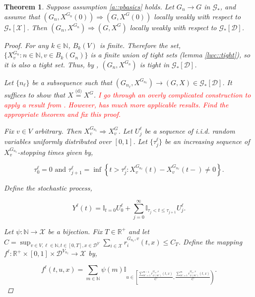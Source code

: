 \documentclass[12pt]{article}
\newcommand{\mb}{\mathbb}
\newcommand{\mc}{\mathcal}
\newcommand{\ra}{\rightarrow}
\newcommand{\te}{\text}
\newcommand{\tr}{\textcolor{red}}
\newcommand{\ind}{\hspace{24pt}}
\newcommand{\deq}{\overset{\text{(d)}}{=}}			%
\newcommand{\cad}{\mc{D}}							%
\newcommand{\sta}{\mc{X}}							%
\newcommand{\Xf}{X}									%
\newcommand{\rate}{r}								%
\newcommand{\xf}{x}									%
\newcommand{\vind}[1]{_{#1}}						%
\newcommand{\tme}[1]{(#1)}							%
\newcommand{\gind}[1]{^{#1}}						%
\newcommand{\stpara}[1]{_{#1}}						%
\newcommand{\gvpara}[2]{^{#1,#2}}					%
\newcommand{\jumpbd}[1]{C_{#1}}						%
\newcommand{\tmepro}[2]{(#1,#2)}					%
\newcommand{\Gs}{\mc{G}_\ast}						%
\newcommand{\trnc}[1]{B_{#1}}						%
\renewcommand{\sp}[1]{[#1]}							%
\newcommand{\Xg}{Y}									%
\newcommand{\rt}{\tau}								%
\renewcommand{\it}[1]{_{#1}}						%
\newtheorem{thms}{Theorem}[section]
\begin{document}
\begin{thms}
Suppose assumption \ref{a::pbasics} holds. Let \(G\it{n} \ra G\) in \(\Gs\), and assume that \((G\it{n},\Xf\gind{G\it{n}}\tme{0}) \Rightarrow (G,\Xf\gind{G}\tme{0})\) locally weakly with respect to \(\Gs\sp{\sta}\). Then \((G\it{n},\Xf\gind{G\it{n}}) \Rightarrow (G,\Xf\gind{G})\) locally weakly with respect to \(\Gs\sp{\cad}\).

\begin{proof}
For any \(k \in \mb{N}\), \(\trnc{k}(V)\) is finite. Therefore the set, \(\{\Xf\gind{G\it{n}}\vind{v}: n \in \mb{N}, v \in \trnc{k}(G\it{n})\}\) is a finite union of tight sets (lemma \ref{lwc::tight}), so it is also a tight set. Thus, by \cite[Lemma A.6]{LacRamWu19}, \((G\it{n},\Xf\gind{G\it{n}})\) is tight in \(\Gs\sp{\cad}\).

\ind Let \(\{n_\ell\}\) be a subsequence such that \((G\it{n_\ell},\Xf\gind{G\it{n_\ell}}) \ra (G,\Xf) \in \Gs\sp{\cad}\). It suffices to show that \(\Xf \deq \Xf\gind{G}\). \tr{I go through an overly complicated construction to apply a result from \cite{KurPro91}. However, \cite{Kur91} has much more applicable results. Find the appropriate theorem and fix this proof.}

\ind Fix \(v \in V\) arbitrary. Then \(\Xf\gind{G\it{n_\ell}}\vind{v} \Rightarrow \Xf\gind{G}\vind{v}\). Let \(U\it{j}^\ell\) be a sequence of i.i.d. random variables uniformly distributed over \([0,1]\). Let \(\{\rt\it{j}^\ell\}\) be an increasing sequence of \(\Xf\gind{G\it{n_\ell}}\vind{v}\)-stopping times given by,

\[\rt\it{0}^\ell = 0\te{ and } \rt\it{j+1}^\ell = \inf\left\{t > \rt\it{j}^\ell: \Xf\gind{G\it{n_\ell}}\vind{v}\tme{t} - \Xf\gind{G\it{n_\ell}}\vind{v}\tme{t-} \neq 0\right\}.\]

Define the stochastic process,

\[\Xg^\ell\tme{t} = \mb{I}_{t = 0}U^\ell\it{0} + \sum_{j=0}^\infty \mb{I}_{\rt\it{j} < t \leq \rt\it{j+1}} U^\ell\it{j}.\]

Let \(\psi: \mb{N} \ra \sta\) be a bijection. Fix \(T \in \mb{R}^+\) and let \(C = \sup_{v \in V,\ell \in \mb{N},t \in [0,T],\xf\in\cad^V}\sum_{i\in \sta} \rate\gvpara{G\it{n_\ell}}{v}\stpara{i}\tmepro{t}{\xf}\leq \jumpbd{T}\). Define the mapping \(f^\ell:\mb{R}^+\times [0,1] \times \cad^{V\it{n_\ell}}\ra \sta\) by,

\[f^\ell(t,u,\xf) = \sum_{m\in \mb{N}} \psi(m)\mb{I}_{u \in \left[\frac{\sum_{m'=1}^{m-1} \rate\gvpara{G\it{n_\ell}}{v}\stpara{\psi(m')}\tmepro{t}{\xf}}{C}, \frac{\sum_{m'=1}^{m} \rate\gvpara{G\it{n_\ell}}{v}\stpara{\psi(m')}\tmepro{t}{\xf}}{C}\right)}.\]


\end{proof}
\end{thms}
\end{document}
